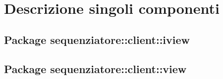 \section{Descrizione singoli componenti}
\subsection{Package sequenziatore::client::iview}



\subsection{Package sequenziatore::client::view}

